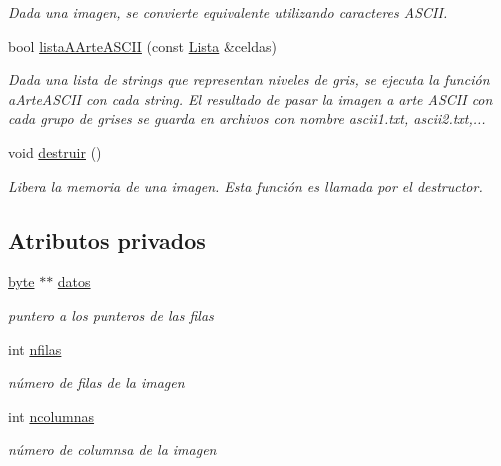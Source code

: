 \begin{DoxyCompactItemize}
\begin{DoxyCompactList}\small\item\em Dada una imagen, se convierte equivalente utilizando caracteres A\+S\+C\+I\+I. \end{DoxyCompactList}\item 
bool \hyperlink{class_imagen_a0266a25af1413cb57d9da880e7881860}{lista\+A\+Arte\+A\+S\+C\+I\+I} (const \hyperlink{class_lista}{Lista} \&celdas)
\begin{DoxyCompactList}\small\item\em Dada una lista de strings que representan niveles de gris, se ejecuta la función  a\+Arte\+A\+S\+C\+I\+I con cada string. El resultado de pasar la imagen a arte A\+S\+C\+I\+I con cada grupo de grises se guarda en archivos con nombre ascii1.\+txt, ascii2.\+txt,... \end{DoxyCompactList}\item 
void \hyperlink{class_imagen_aea77aed960516bf385f94249f074dd9a}{destruir} ()
\begin{DoxyCompactList}\small\item\em Libera la memoria de una imagen. Esta función es llamada por el destructor. \end{DoxyCompactList}\end{DoxyCompactItemize}
\subsection*{Atributos privados}
\begin{DoxyCompactItemize}
\item 
\hyperlink{imagen_8h_a0c8186d9b9b7880309c27230bbb5e69d}{byte} $\ast$$\ast$ \hyperlink{class_imagen_a74bf3487e42bb65862e994883fa05b33}{datos}
\begin{DoxyCompactList}\small\item\em puntero a los punteros de las filas \end{DoxyCompactList}\item 
int \hyperlink{class_imagen_a89599a9692fbe4cb60ee16c0a30a64ef}{nfilas}
\begin{DoxyCompactList}\small\item\em número de filas de la imagen \end{DoxyCompactList}\item 
int \hyperlink{class_imagen_a4b38c0642ab84fe5f945272180ae8306}{ncolumnas}
\begin{DoxyCompactList}\small\item\em número de columnsa de la imagen \end{DoxyCompactList}\end{DoxyCompactItemize}


